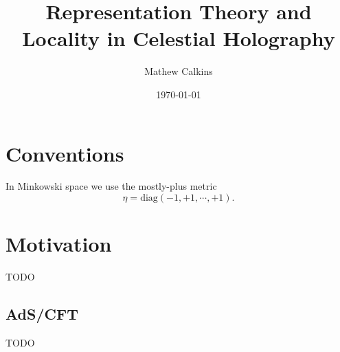 \documentclass[11pt,letterpaper]{article}
\begin{document}
\title{Representation Theory and Locality in Celestial Holography}

\author{Mathew Calkins}

\date{\today}

 
\maketitle


\tableofcontents
\section{Conventions}
In Minkowski space we use the mostly-plus metric \begin{equation}
\eta = \mbox{diag}(-1, +1, \cdots, +1).
\end{equation}

\section{Motivation}
TODO

\subsection{AdS/CFT}
TODO
\end{document}
